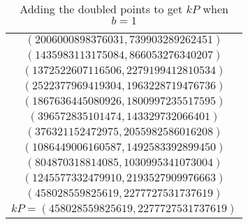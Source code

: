 \begin{table}[htbp]
	\centering
	\begin{tabular}{c}
		$(2006000898376031, 739903289262451)$\\
		$(1435983113175084, 866053276340207)$\\
		$(1372522607116506, 2279199412810534)$\\
		$(2522377969419304, 1963228719476736)$\\
		$(1867636445080926, 1800997235517595)$\\
		$(396572835101474, 143329732066401)$\\
		$(376321152472975, 2055982586016208)$\\
		$(1086449006160587, 1492583392899450)$\\
		$(804870318814085, 1030995341073004)$\\
		$(1245577332479910, 2193527909976663)$\\
		$(458028559825619, 2277727531737619)$\\
		$kP = (458028559825619,2277727531737619)$
	\end{tabular}
	\label{unsuccessfuladd}
	\caption{Adding the doubled points to get $kP$ when $b=1$}
\end{table}

